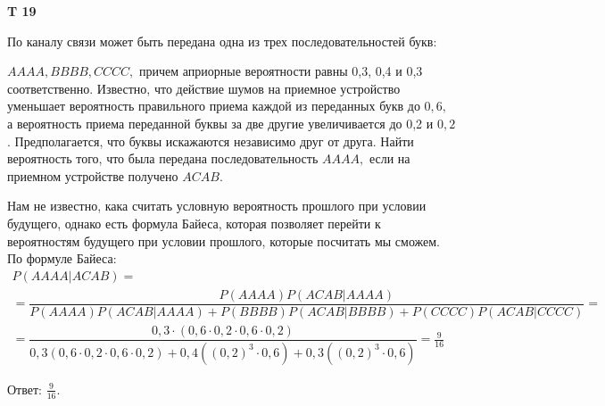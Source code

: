 \documentclass[a4paper,12pt]{article} %
\begin{document}
\begin{example}\textbf{T 19}

По каналу связи может быть передана одна из трех последовательностей букв: 

$A A A A, B B B B, C C C C,$ причем априорные вероятности равны 0,3, 0,4 и 0,3 соответственно. 
Известно, что действие шумов на приемное устройство уменьшает вероятность правильного приема каждой из переданных букв до $0,6,$ 
а вероятность приема переданной буквы за две другие увеличивается до 0,2 и $0,2$. 
Предполагается, что буквы искажаются независимо друг от друга. 
Найти вероятность того, что была передана последовательность $A A A A,$ если на приемном устройстве получено $A C A B$.

Нам не известно, кака считать условную вероятность прошлого при условии будущего, однако есть формула Байеса, 
которая позволяет перейти к вероятностям будущего при условии прошлого, которые посчитать мы сможем.
По формуле Байеса:
\begin{multline}
P(AAAA|ACAB)=\\
=\dfrac{P(AAAA) P(ACAB|AAAA)}{P(AAAA) P(ACAB|AAAA) + P(BBBB) P(ACAB|BBBB)+ P(CCCC) P(ACAB|CCCC) }=\\
=\dfrac{0,3\cdot (0,6 \cdot  0,2 \cdot 0,6 \cdot 0,2)}{0,3 (0,6 \cdot  0,2 \cdot 0,6 \cdot 0,2)+ 0,4 ((0,2)^3\cdot 0,6) +0,3 ((0,2)^3 \cdot 0,6)}=
\frac{9}{16} 
\end{multline}


Ответ: $\frac{9}{16}$.


\end{example}
\end{document}
